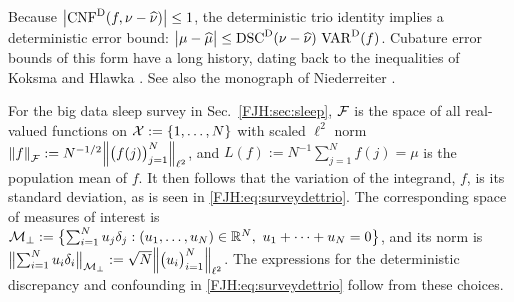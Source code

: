 \documentclass[graybox,footinfo]{svmult}
\DeclareMathOperator{\algn}{CNF}
\DeclareMathOperator{\disc}{DSC}
\DeclareMathOperator{\Var}{VAR}
\begin{document}
Because $\abs{\algn^\Dt(f,\nu - \hnu)} \le 1$, the deterministic trio 
identity implies a deterministic error bound:  $\abs{\mu - \hmu}  \le \disc^\Dt(\nu - \hnu) 
\, \Var^{\Dt}(f)$.  
Cubature error bounds of this form have a long history, dating back to the inequalities of 
Koksma \cite{Kok42} and Hlawka \cite{Hla61}. See also the monograph of Niederreiter 
\cite{Nie92}.

For the big data sleep survey in Sec.\ \ref{FJH:sec:sleep}, ${\mathcal{F}}$ is the space of all 
real-valued functions on ${\mathcal{X}} := \{1, \ldots, N\}$ with scaled $\ell^2$ norm 
$\left \lVert f \right \rVert_{{\mathcal{F}}} 
:= N^{-1/2} \Bigl \lVert \bigl(f(j)\bigr)_{j=1}^N \Bigr \rVert_{\ell^2}$, and $L(f) := N^{-1}\sum_{j=1}^N f(j) 
= 
\mu $ is the population mean of $f$. It then follows that the variation of 
the integrand, $f$, is its standard deviation, as is seen in \eqref{FJH:eq:surveydettrio}.
The corresponding space of measures of interest is ${\mathcal{M}}_\bot := \bigl \{ \sum_{i=1}^N 
u_j 
\delta_{j} : (u_1, \ldots, u_N) \in {\mathbb{R}}^N,\ u_1 + \cdots + u_N= 0 \bigr \}$, and its norm is 
$\bigl \lVert \sum_{i=1}^N u_i \delta_{i} \bigr \rVert_{{\mathcal{M}}_\bot} : = 
	\sqrt{N} \Bigl \lVert \bigl(u_i\bigr)_{i=1}^N \Bigr \rVert_{\ell^2}$.   The expressions for the 
	deterministic 
	discrepancy and confounding in \eqref{FJH:eq:surveydettrio} follow from these 
	choices.
\end{document}
